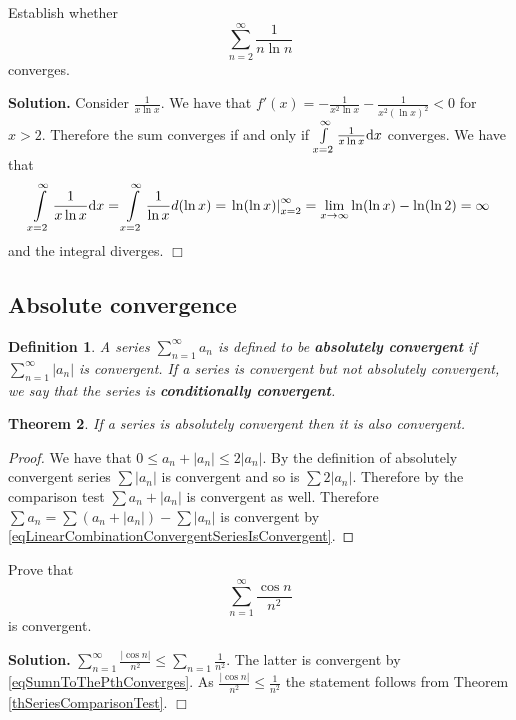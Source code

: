 \documentclass[12pt]{book}
\newenvironment{solution}{\medskip\noindent\textbf{Solution.} }{$\Box$}
\newtheorem{theorem}{Theorem}[section]
\newtheorem{definition}[theorem]{Definition}
\renewcommand{\emph}{\textbf}
\begin{document}
Establish whether
\[ \sum\limits_{n=2}^{\infty}\frac{1}{n\ln n}
\]
converges.

\begin{solution}
Consider $\frac{1}{x\ln x}$. We have that $\displaystyle f'(x)= -\frac{1}{x^2\ln x}- \frac{1}{x^2(\ln x)^2}<0$ for $x>2$. Therefore the sum converges if and only if $\int\limits_{x=2}^{\infty}\frac{1}{x\ln x}{\normalfont \text{d}} x$ converges. We have that
\[ \int\limits_{x=2}^{\infty}\frac{1}{x\ln x}{\normalfont \text{d}} x= \int\limits_{x=2}^\infty \frac{1}{\ln x}d(\ln x) = \left.\ln (\ln x)\right|_{x=2}^{\infty}= \lim\limits_{x\to \infty} \ln (\ln x ) - \ln (\ln 2)=\infty
\]
and the integral diverges.
\end{solution}

\subsection{Absolute convergence}
\begin{definition}
A series $\sum_{n=1}^\infty a_n$ is defined to be \emph{absolutely convergent} if $\sum_{n=1}^\infty |a_n|$ is convergent.  If a series is convergent but not absolutely convergent, we say that the series is \emph{conditionally convergent}. 
\end{definition}

\begin{theorem} \label{thAbsoluteConvergenceImpliesConvergence}
If a series is absolutely convergent then it is also convergent.
\end{theorem}

\begin{proof}
We have that $0\leq a_n+|a_n|\leq 2|a_n|$. By the definition of absolutely convergent series $\sum |a_n|$ is convergent and so is $\sum 2|a_n|$. Therefore by the comparison test $\sum a_n+|a_n|$ is convergent as well. Therefore $\sum a_n= \sum (a_n+|a_n|)-\sum |a_n|$  is convergent by \eqref{eqLinearCombinationConvergentSeriesIsConvergent}.
\end{proof}

Prove that
\[
\sum_{n=1}^{\infty} \frac{\cos n}{n^2}
\]
is convergent.

\begin{solution}
$\sum\limits_{n=1}^{\infty} \frac{|\cos n |}{n^2} \leq \sum\limits_{n=1}\frac{1}{n^2}$. The latter is convergent by \eqref{eqSumnToThePthConverges}. As $\frac{|\cos n|}{n^2}\leq \frac{1}{n^2}$ the statement follows from Theorem \ref{thSeriesComparisonTest}.
\end{solution}
\end{document}
